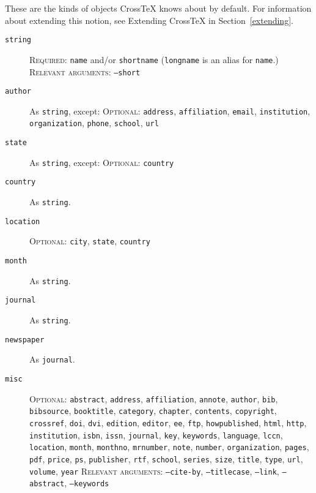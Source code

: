 \documentclass{article}
\newcommand{\XTeX}{Cross\TeX}
\begin{document}
These are the kinds of objects \XTeX{} knows about by default. For information about extending this notion, see Extending \XTeX{} in Section~\ref{extending}.

\begin{description}

\item[\texttt{string}]
\textsc{Required:} \texttt{name} and/or \texttt{shortname} (\texttt{longname} is an alias for \texttt{name}.)
\textsc{Relevant arguments:} \texttt{--short}

\item[\texttt{author}] As \texttt{string}, except:
\textsc{Optional:} \texttt{address}, \texttt{affiliation}, \texttt{email}, \texttt{institution}, \texttt{organization}, \texttt{phone}, \texttt{school}, \texttt{url}

\item[\texttt{state}] As \texttt{string}, except:
\textsc{Optional:} \texttt{country}

\item[\texttt{country}] As \texttt{string}.

\item[\texttt{location}]
\textsc{Optional:} \texttt{city}, \texttt{state}, \texttt{country}

\item[\texttt{month}] As \texttt{string}.

\item[\texttt{journal}] As \texttt{string}.

\item[\texttt{newspaper}] As \texttt{journal}.

\item[\texttt{misc}]
\textsc{Optional:}
\texttt{abstract},
\texttt{address},
\texttt{affiliation},
\texttt{annote},
\texttt{author},
\texttt{bib},
\texttt{bibsource},
\texttt{booktitle},
\texttt{category},
\texttt{chapter},
\texttt{contents},
\texttt{copyright},
\texttt{crossref},
\texttt{doi},
\texttt{dvi},
\texttt{edition},
\texttt{editor},
\texttt{ee},
\texttt{ftp},
\texttt{howpublished},
\texttt{html},
\texttt{http},
\texttt{institution},
\texttt{isbn},
\texttt{issn},
\texttt{journal},
\texttt{key},
\texttt{keywords},
\texttt{language},
\texttt{lccn},
\texttt{location},
\texttt{month},
\texttt{monthno},
\texttt{mrnumber},
\texttt{note},
\texttt{number},
\texttt{organization},
\texttt{pages},
\texttt{pdf},
\texttt{price},
\texttt{ps},
\texttt{publisher},
\texttt{rtf},
\texttt{school},
\texttt{series},
\texttt{size},
\texttt{title},
\texttt{type},
\texttt{url},
\texttt{volume},
\texttt{year}
\textsc{Relevant arguments:} \texttt{--cite-by}, \texttt{--titlecase}, \texttt{--link}, \texttt{--abstract}, \texttt{--keywords}


\end{description}
\end{document}
